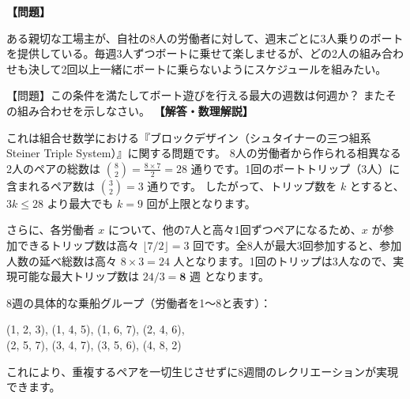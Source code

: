 \documentclass[10pt,a4paper,oneside,openany]{ltjsbook}
\begin{document}
\begin{tcolorbox}[colback=softblue,colframe=primaryblue,title=\textbf{第 269 問：ボートの三人（労働者の週末レクリエーション） （原題: THREE MEN IN A BOAT.）},arc=2mm,boxrule=1pt,breakable]
\textbf{【問題】}\par\vspace{0.3em}
ある親切な工場主が、自社の8人の労働者に対して、週末ごとに3人乗りのボートを提供している。毎週3人ずつボートに乗せて楽しませるが、どの2人の組み合わせも決して2回以上一緒にボートに乗らないようにスケジュールを組みたい。

【問題】この条件を満たしてボート遊びを行える最大の週数は何週か？ またその組み合わせを示しなさい。
\tcblower
\textbf{【解答・数理解説】}\par\vspace{0.3em}
これは組合せ数学における『ブロックデザイン（シュタイナーの三つ組系 Steiner Triple System）』に関する問題です。
8人の労働者から作られる相異なる2人のペアの総数は $\binom{8}{2} = \frac{8 \times 7}{2} = 28$ 通りです。1回のボートトリップ（3人）に含まれるペア数は $\binom{3}{2} = 3$ 通りです。
したがって、トリップ数を $k$ とすると、$3k \le 28$ より最大でも $k = 9$ 回が上限となります。

さらに、各労働者 $x$ について、他の7人と高々1回ずつペアになるため、$x$ が参加できるトリップ数は高々 $\lfloor 7/2 \rfloor = 3$ 回です。全8人が最大3回参加すると、参加人数の延べ総数は高々 $8 \times 3 = 24$ 人となります。1回のトリップは3人なので、実現可能な最大トリップ数は $24 / 3 = \mathbf{8 \text{ 週}}$ となります。

8週の具体的な乗船グループ（労働者を1〜8と表す）：
\begin{center}
(1, 2, 3), \quad (1, 4, 5), \quad (1, 6, 7), \quad (2, 4, 6), \\
(2, 5, 7), \quad (3, 4, 7), \quad (3, 5, 6), \quad (4, 8, 2) 
\end{center}
これにより、重複するペアを一切生じさせずに8週間のレクリエーションが実現できます。
\end{tcolorbox}
\end{document}
